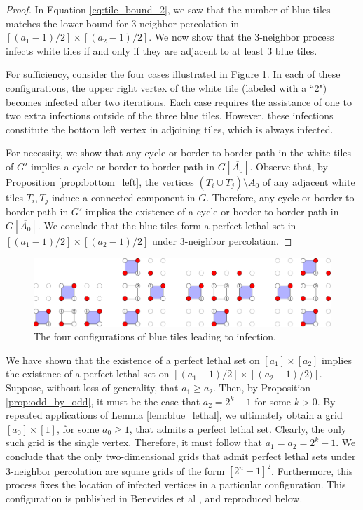 \begin{proof}
In Equation \ref{eq:tile_bound_2}, we saw that the number of blue tiles matches the lower bound for 3-neighbor percolation in $[(a_1-1)/2] \times [(a_2-1)/2]$. We now show that the 3-neighbor process infects white tiles if and only if they are adjacent to at least 3 blue tiles.

For sufficiency, consider the four cases illustrated in Figure \ref{fig:tile_infection}. In each of these configurations, the upper right vertex of the white tile (labeled with a ``2") becomes infected after two iterations. Each case requires the assistance of one to two extra infections outside of the three blue tiles. However, these infections constitute the bottom left vertex in adjoining tiles, which is always infected.

For necessity, we show that any cycle or border-to-border path in the white tiles of $G'$ implies a cycle or border-to-border path in $G[\overline{A_0}]$. Observe that, by Proposition \ref{prop:bottom_left}, the vertices $(T_i \cup T_{j}) \setminus A_0$ of any adjacent white tiles $T_i, T_j$ induce a connected component in $G$. Therefore, any cycle or border-to-border path in $G'$ implies the existence of a cycle or border-to-border path in $G[\overline{A_0}]$. We conclude that the blue tiles form a perfect lethal set in $[(a_1-1)/2] \times [(a_2-1)/2]$ under 3-neighbor percolation.
\end{proof}

\begin{figure}[]
\centering
\includegraphics[width=\textwidth]{figures/6/tile_infection.pdf}
\caption{The four configurations of blue tiles leading to infection.}
\label{fig:tile_infection}
\end{figure} 


We have shown that the existence of a perfect lethal set on $[a_1] \times [a_2]$ implies the existence of a perfect lethal set on $[(a_1-1)/2] \times [(a_2-1)/2)]$. Suppose, without loss of generality, that $a_1 \geq a_2$. Then, by Proposition \ref{prop:odd_by_odd}, it must be the case that $a_2 = 2^{k}-1$ for some $k> 0$. By repeated applications of Lemma \ref{lem:blue_lethal}, we ultimately obtain a grid $[a_0] \times [1]$, for some $a_0 \ge 1$, that admits a perfect lethal set. Clearly, the only such grid is the single vertex. Therefore, it must follow that $a_1 = a_2 = 2^k-1$. We conclude that the only two-dimensional grids that admit perfect lethal sets under 3-neighbor percolation are square grids of the form $[2^n-1]^2$. Furthermore, this process fixes the location of infected vertices in a particular configuration. This configuration is published in Benevides et al \cite{benevides:2021}, and reproduced below.

